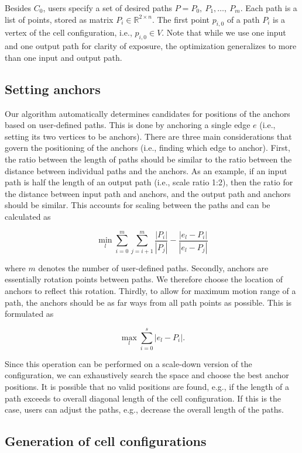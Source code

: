 Besides $C_0$, users specify a set of desired paths $P={P_0,\ P_1,\ldots,\ P_m}$. Each path is a list of points, stored as matrix $P_i\in\mathbb{R}^{2\times n}$. The first point $p_{i,0}$ of a path $P_i$ is a vertex of the cell configuration, i.e.,  $p_{i,0}\in V$. Note that while we use one input and one output path for clarity of exposure, the optimization generalizes to more than one input and output path.


\subsection{Setting anchors}

Our algorithm automatically determines candidates for positions of the anchors based on user-defined paths. This is done by anchoring a single edge $e$ (i.e., setting its two vertices to be anchors). There are three main considerations that govern the positioning of the anchors (i.e., finding which edge to anchor). First, the ratio between the length of paths should be similar to the ratio between the distance between individual paths and the anchors. As an example, if an input path is half the length of an output path (i.e., scale ratio 1:2), then the ratio for the distance between input path and anchors, and the output path and anchors should be similar. This accounts for scaling between the paths and can be calculated as

$$\min_l
{
\sum_{i=0}^{m}
\sum_{j=i+1}^{m}
{\frac{\left| P_i \right|}{\left| P_j \right|}}
-
{\frac{\left| e_l-P_i \right|}{\left| e_l-P_j \right|}}
}
$$

where $m$ denotes the number of user-defined paths. Secondly, anchors are essentially rotation points between paths. We therefore choose the location of anchors to reflect this rotation. Thirdly, to allow for maximum motion range of a path, the anchors should be as far ways from all path points as possible. This is formulated as 

$$\max_l{\sum_{i=0}^{s}\left|e_l-P_i\right|.}$$

Since this operation can be performed on a scale-down version of the configuration, we can exhaustively search the space and choose the best anchor positions. It is possible that no valid positions are found, e.g., if the length of a path exceeds to overall diagonal length of the cell configuration. If this is the case, users can adjust the paths, e.g., decrease the overall length of the paths.


\subsection{Generation of cell configurations}

